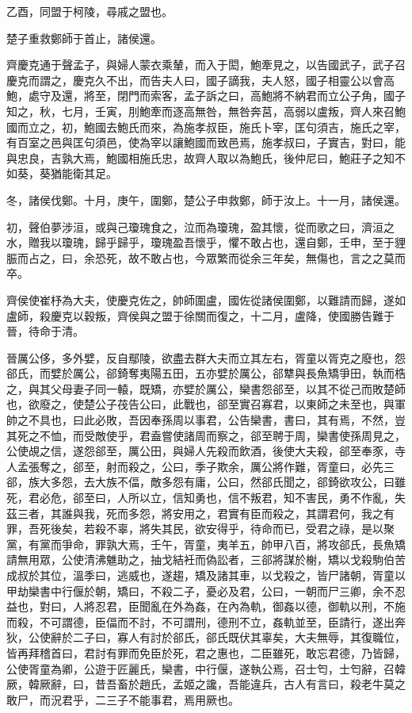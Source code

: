 \begin{pinyinscope}
乙酉，同盟于柯陵，尋戚之盟也。

楚子重救鄭師于首止，諸侯還。

齊慶克通于聲孟子，與婦人蒙衣乘輦，而入于閎，鮑牽見之，以告國武子，武子召慶克而謂之，慶克久不出，而告夫人曰，國子謫我，夫人怒，國子相靈公以會高鮑，處守及還，將至，閉門而索客，孟子訴之曰，高鮑將不納君而立公子角，國子知之，秋，七月，壬寅，刖鮑牽而逐高無咎，無咎奔莒，高弱以盧叛，齊人來召鮑國而立之，初，鮑國去鮑氏而來，為施孝叔臣，施氏卜宰，匡句須吉，施氏之宰，有百室之邑與匡句須邑，使為宰以讓鮑國而致邑焉，施孝叔曰，子實吉，對曰，能與忠良，吉孰大焉，鮑國相施氏忠，故齊人取以為鮑氏，後仲尼曰，鮑莊子之知不如葵，葵猶能衛其足。

冬，諸侯伐鄭。十月，庚午，圍鄭，楚公子申救鄭，師于汝上。十一月，諸侯還。

初，聲伯夢涉洹，或與己瓊瑰食之，泣而為瓊瑰，盈其懷，從而歌之曰，濟洹之水，贈我以瓊瑰，歸乎歸乎，瓊瑰盈吾懷乎，懼不敢占也，還自鄭，壬申，至于貍脤而占之，曰，余恐死，故不敢占也，今眾繁而從余三年矣，無傷也，言之之莫而卒。

齊侯使崔杼為大夫，使慶克佐之，帥師圍盧，國佐從諸侯圍鄭，以難請而歸，遂如盧師，殺慶克以穀叛，齊侯與之盟于徐關而復之，十二月，盧降，使國勝告難于晉，待命于清。

晉厲公侈，多外嬖，反自鄢陵，欲盡去群大夫而立其左右，胥童以胥克之廢也，怨郤氏，而嬖於厲公，郤錡奪夷陽五田，五亦嬖於厲公，郤犨與長魚矯爭田，執而梏之，與其父母妻子同一轅，既矯，亦嬖於厲公，欒書怨郤至，以其不從己而敗楚師也，欲廢之，使楚公子茷告公曰，此戰也，郤至實召寡君，以東師之未至也，與軍帥之不具也，曰此必敗，吾因奉孫周以事君，公告欒書，書曰，其有焉，不然，豈其死之不恤，而受敵使乎，君盍嘗使諸周而察之，郤至聘于周，欒書使孫周見之，公使覘之信，遂怨郤至，厲公田，與婦人先殺而飲酒，後使大夫殺，郤至奉豕，寺人孟張奪之，郤至，射而殺之，公曰，季子欺余，厲公將作難，胥童曰，必先三郤，族大多怨，去大族不偪，敵多怨有庸，公曰，然郤氏聞之，郤錡欲攻公，曰雖死，君必危，郤至曰，人所以立，信知勇也，信不叛君，知不害民，勇不作亂，失茲三者，其誰與我，死而多怨，將安用之，君實有臣而殺之，其謂君何，我之有罪，吾死後矣，若殺不辜，將失其民，欲安得乎，待命而已，受君之祿，是以聚黨，有黨而爭命，罪孰大焉，壬午，胥童，夷羊五，帥甲八百，將攻郤氏，長魚矯請無用眾，公使清沸魋助之，抽戈結衽而偽訟者，三郤將謀於榭，矯以戈殺駒伯苦成叔於其位，溫季曰，逃威也，遂趨，矯及諸其車，以戈殺之，皆尸諸朝，胥童以甲劫欒書中行偃於朝，矯曰，不殺二子，憂必及君，公曰，一朝而尸三卿，余不忍益也，對曰，人將忍君，臣聞亂在外為姦，在內為軌，御姦以德，御軌以刑，不施而殺，不可謂德，臣偪而不討，不可謂刑，德刑不立，姦軌並至，臣請行，遂出奔狄，公使辭於二子曰，寡人有討於郤氏，郤氏既伏其辜矣，大夫無辱，其復職位，皆再拜稽首曰，君討有罪而免臣於死，君之惠也，二臣雖死，敢忘君德，乃皆歸，公使胥童為卿，公遊于匠麗氏，欒書，中行偃，遂執公焉，召士匄，士匄辭，召韓厥，韓厥辭，曰，昔吾畜於趙氏，孟姬之讒，吾能違兵，古人有言曰，殺老牛莫之敢尸，而況君乎，二三子不能事君，焉用厥也。


\end{pinyinscope}
